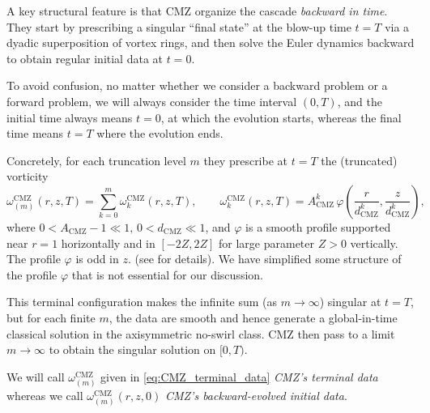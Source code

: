 \documentclass[reqno,11pt]{amsart}
\begin{document}
A key structural feature is that CMZ organize the cascade \emph{backward in time}.
They start by prescribing a singular ``final state'' at the blow-up time $t=T$ via a dyadic
superposition of vortex rings, and then solve the Euler dynamics backward to obtain
regular initial data at $t=0$.

To avoid confusion, no matter whether we consider a backward problem or a forward problem,
we will always consider the time interval $(0,T)$, and the initial time always means $t=0$, at which the evolution starts, whereas the final time means $t=T$ where the evolution ends.

Concretely, for each truncation level $m$ they prescribe at $t=T$ the (truncated) vorticity
\begin{equation}\label{eq:CMZ_terminal_data}
\omega^{\mathrm{CMZ}}_{(m)}(r,z,T)
=\sum_{k=0}^{m}\omega^{\mathrm{CMZ}}_{k}(r,z,T),
\qquad
\omega^{\mathrm{CMZ}}_{k}(r,z,T)
= A_{\mathrm{CMZ}}^{k}\,
\varphi
\left(
\frac{r}{d_{\mathrm{CMZ}}^{k}},
\frac{z}{d_{\mathrm{CMZ}}^{k}}
\right),
\end{equation}
where $0<A_{\mathrm{CMZ}}-1\ll1, \, 0<d_{\mathrm{CMZ}}\ll 1$, and $\varphi$ is a smooth profile supported near $r=1$ horizontally and in $[-2Z,2Z]$ for large parameter $Z>0$ vertically.
The profile $\varphi$ is odd in $z$. (see \cite{CordobaMartinezZheng25} for details). We have simplified some structure of the profile $\varphi$ that is not essential for our discussion.


This terminal configuration makes the infinite sum (as $m\to\infty$) singular at $t=T$, but
for each finite $m$, the data are smooth and hence generate a global-in-time classical solution in the axisymmetric no-swirl class.
CMZ then pass to a limit $m\to\infty$ to obtain the singular solution on $[0,T)$.

We will call $\omega_{(m)}^{\mathrm{CMZ}}$ given in \eqref{eq:CMZ_terminal_data} \emph{CMZ's terminal data} whereas we call $\omega_{(m)}^{\mathrm{CMZ}}(r,z,0)$ \emph{CMZ's backward-evolved initial data}.
\end{document}
